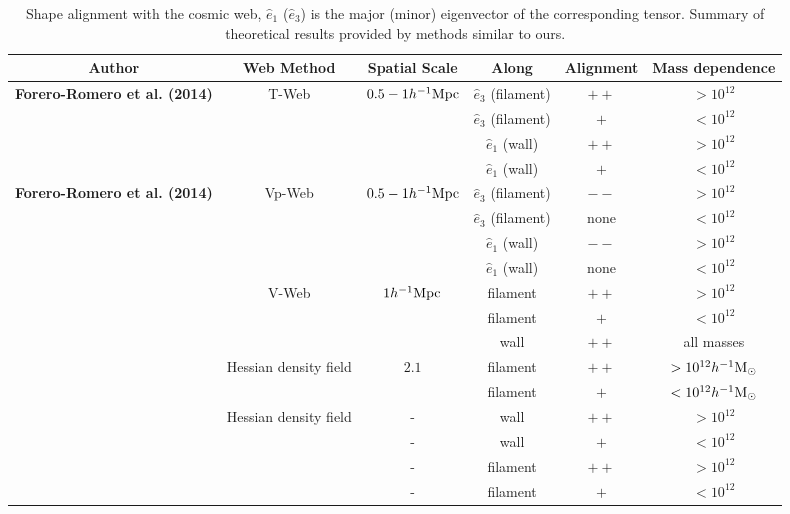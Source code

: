 \documentclass[useAMS,usenatbib]{mn2e}
\newcommand{\hMpc}{{\ifmmode{h^{-1}{\rm Mpc}}\else{$h^{-1}$Mpc }\fi}}
\newcommand{\hMsun}{{\ifmmode{h^{-1}{\rm
        {M_{\odot}}}}\else{$h^{-1}{\rm{M_{\odot}}}$~}\fi}}
\begin{document}
\begin{table}
\begin{tabular}{cccccc}\hline\hline
Author & Web Method & Spatial Scale & Along &
Alignment & Mass dependence\\\hline

{\bf Forero-Romero et al. (2014)} & T-Web & $0.5-1 \hMpc$ &
$\hat{e}_3$ (filament) &$++$ & $>10^{12}$\hMsun\\
&   & &
$\hat{e}_3$ (filament) & $+$ & $<10^{12}$\hMsun\\

&   & &
$\hat{e}_1$ (wall) & $++$ & $>10^{12}$\hMsun\\

&   & &
$\hat{e}_1$ (wall) & $+$ & $<10^{12}$\hMsun\\\hline

{\bf Forero-Romero et al. (2014)} & Vp-Web & $0.5-1 \hMpc$ &
$\hat{e}_3$ (filament) &$--$ & $>10^{12}$\hMsun\\
&   & &
$\hat{e}_3$ (filament) & none & $<10^{12}$\hMsun\\
&   & &
$\hat{e}_1$ (wall) & $--$ & $>10^{12}$\hMsun\\

&   & &
$\hat{e}_1$ (wall) & none & $<10^{12}$\hMsun\\\hline


\cite{Libeskind2013} & V-Web & $1 \hMpc$ &
filament &$++$ & $>10^{12}$\hMsun\\
&   & &
filament &$+$ & $<10^{12}$\hMsun\\
&   & &
wall & $++$ & all masses\\\hline

\cite{Zhang2009}  & Hessian density field &  $2.1$\hMpc &
filament & $++$ & $>10^{12}\hMsun$\\

& &  &
filament & $+$ & $<10^{12}\hMsun$\\\hline

\cite{AragonCalvo2007} & Hessian density field & - &
wall & $++$ & $>10^{12}$\hMsun\\

& & - &
wall & $+$ & $<10^{12}$\hMsun\\

& & - &
filament& $++$ & $>10^{12}$\hMsun\\

& & - &
filament& $+$ & $<10^{12}$\hMsun\\\hline \hline

\end{tabular}\\
\caption{Shape alignment with the cosmic web, 
$\hat{e}_1$ ($\hat{e}_3$)
is the major (minor) eigenvector of
the corresponding tensor. 
Summary of theoretical
  results provided by methods similar to ours.}
\end{table}
\end{document}
